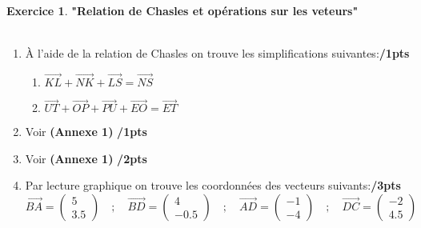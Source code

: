 \documentclass[a4paper,10.9pt]{article}
\theoremstyle{definition}
\newtheorem{exo}{Exercice}
\newcommand{\V}{\overrightarrow}
\begin{document}
\begin{exo} \textbf{"Relation de Chasles et opérations sur les veteurs"}\\\hfil\\
\begin{enumerate}
\item À l'aide de la relation de Chasles on trouve les simplifications suivantes:\hfill\textbf{/1pts}
\begin{multicols}{2}
\begin{enumerate}[$\diamond$]

		\item $\V{KL}+\V{NK} + \V{LS} =  \V{NS}$\\
		\item $\V{UT}+\V{OP}+\V{PU}+\V{EO} = \V{ET} $ \\

\end{enumerate}
\end{multicols}
 
\item Voir \textbf{(Annexe 1)} \hfill\textbf{/1pts}
\item Voir \textbf{(Annexe 1)} \hfill\textbf{/2pts}
\item Par lecture graphique on trouve les coordonnées des vecteurs suivants:\hfill\textbf{/3pts}
$$\V{BA} = \begin{pmatrix} 5\\3.5\end{pmatrix}\quad; \quad\V{BD} = \begin{pmatrix}4\\-0.5\end{pmatrix}\quad;\quad \V{AD} = \begin{pmatrix}-1\\-4\end{pmatrix} \quad; \quad\V{DC}= \begin{pmatrix}-2\\4.5\end{pmatrix}$$\hfill\\[0.5cm]
\begin{multicols}{2}
	\begin{enumerate}[$\diamond$]
		

\end{enumerate}
\end{multicols}
\end{enumerate}
\end{exo}
\end{document}
